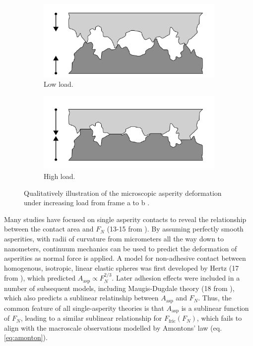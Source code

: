 \begin{figure}[H]
  \centering
  \begin{subfigure}[b]{0.49\textwidth}
      \centering
      \includegraphics[width=\textwidth]{figures/theory/asperities_top.png}
      \caption{Low load.}
      \label{fig:asp_left}
  \end{subfigure}
  \hfill
  \begin{subfigure}[b]{0.49\textwidth}
      \centering
      \includegraphics[width=\textwidth]{figures/theory/asperities_bottom.png}
      \caption{High load.}
      \label{fig:asp_right}
  \end{subfigure}
  \hfill
     \caption{Qualitatively illustration of the microscopic asperity deformation under increasing load from frame a to b \cite{wiki:asperities}.}
     \label{fig:asperity_contact}
\end{figure}
Many studies have focused on single asperity contacts to
reveal the relationship between the contact area and $F_N$ (13-15 from
\cite{mo_friction_2009}). By assuming perfectly smooth asperities, with radii of
curvature from micrometers all the way down to nanometers, continuum mechanics can be used to predict the deformation of asperities as normal force is applied. A model for non-adhesive contact between homogenous, isotropic, linear elastic spheres was
first developed by Hertz (17 from \cite{mo_friction_2009}), which predicted
$A_{\text{asp}} \propto F_N^{2/3}$. Later adhesion effects were included in a
number of subsequent models, including Maugis-Dugdale theory (18 from
\cite{mo_friction_2009}), which also predicts a sublinear relatinship between
$A_{\text{asp}}$ and $F_N$. Thus, the common feature of all single-asperity theories is that $A_{\text{asp}}$ is a sublinear function of $F_N$, leading to a similar sublinear relationship for $F_\text{fric}(F_N)$, which fails to align with the macroscale observations modelled by Amontons’ law (eq. \eqref{eq:amonton}).

